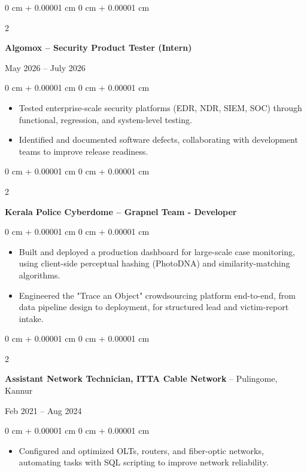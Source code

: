 \documentclass[10pt, a4paper]{article}
\newenvironment{highlights}{
    \begin{itemize}[
        topsep=0.10 cm,
        parsep=0.10 cm,
        partopsep=0pt,
        itemsep=0pt,
        leftmargin=0 cm + 10pt
    ]
}{
    \end{itemize}
} %
\newenvironment{onecolentry}{
    \begin{adjustwidth}{
        0 cm + 0.00001 cm
    }{
        0 cm + 0.00001 cm
    }
}{
    \end{adjustwidth}
} %
\newenvironment{twocolentry}[2][]{
    \onecolentry
    \def\secondColumn{#2}
    \setcolumnwidth{\fill, 4.5 cm}
    \begin{paracol}{2}
}{
    \switchcolumn \raggedleft \secondColumn
    \end{paracol}
    \endonecolentry
} %
\begin{document}
    \vspace{0.2 cm}

\begin{twocolentry}{
    May 2026 – July 2026
}
    \textbf{Algomox – Security Product Tester (Intern)}
\end{twocolentry}

\vspace{0.10 cm}
\begin{onecolentry}
    \begin{highlights}
        \item Tested enterprise-scale security platforms (EDR, NDR, SIEM, SOC) through functional, regression, and system-level testing.
        \item Identified and documented software defects, collaborating with development teams to improve release readiness.
    \end{highlights}
\end{onecolentry}

\vspace{0.2 cm}

\begin{twocolentry}{
}
    \textbf{Kerala Police Cyberdome – Grapnel Team - Developer}
\end{twocolentry}

\vspace{0.10 cm}
\begin{onecolentry}
    \begin{highlights}
        \item Built and deployed a production dashboard for large-scale case monitoring, using client-side perceptual hashing (PhotoDNA) and similarity-matching algorithms.
        \item Engineered the "Trace an Object" crowdsourcing platform end-to-end, from data pipeline design to deployment, for structured lead and victim-report intake.
    \end{highlights}
\end{onecolentry}

    \vspace{0.2 cm}

\begin{twocolentry}{
    Feb 2021 – Aug 2024
}
    \textbf{Assistant Network Technician, ITTA Cable Network} -- Pulingome, Kannur
\end{twocolentry}

\vspace{0.10 cm}
\begin{onecolentry}
    \begin{highlights}
        \item Configured and optimized OLTs, routers, and fiber-optic networks, automating tasks with SQL scripting to improve network reliability.
    \end{highlights}
\end{onecolentry}
\end{document}
